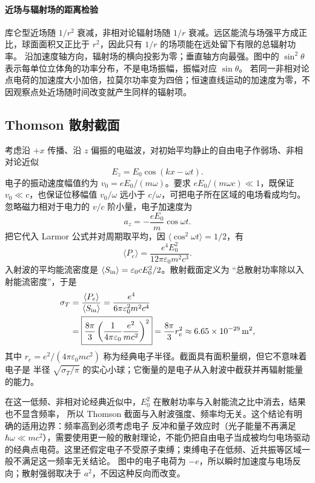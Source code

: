 \paragraph{近场与辐射场的距离检验}
库仑型近场随 $1/r^2$ 衰减，非相对论辐射场随 $1/r$ 衰减。远区能流与场强平方成正比，球面面积又正比于 $r^2$，因此只有 $1/r$ 的场项能在远处留下有限的总辐射功率。
沿加速度轴方向，辐射场的横向投影为零；垂直轴方向最强。图中的 $\sin^2\theta$ 表示每单位立体角的功率分布，不是电场振幅，振幅对应 $\sin\theta$。
若同一非相对论点电荷的加速度大小加倍，拉莫尔功率变为四倍；恒速直线运动的加速度为零，不因观察点处近场随时间改变就产生同样的辐射项。

\subsection{Thomson 散射截面}

考虑沿 $+x$ 传播、沿 $z$ 偏振的电磁波，对初始平均静止的自由电子作弱场、非相对论近似
\begin{equation}
  E_z=E_0\cos(kx-\omega t).
\end{equation}
电子的振动速度幅值约为 $v_0=eE_0/(m\omega)$。要求 $eE_0/(m\omega c)\ll1$，既保证 $v_0\ll c$，也保证位移幅值 $v_0/\omega$ 远小于 $c/\omega$，可把电子所在区域的电场看成均匀。忽略磁力相对于电力的
$v/c$ 阶小量，电子加速度为
\begin{equation}
  a_z=-\frac{eE_0}{m}\cos\omega t.
\end{equation}
把它代入 Larmor 公式并对周期取平均，因 $\langle\cos^2\omega t\rangle=1/2$，有
\begin{equation}
  \langle P_e\rangle=\frac{e^4E_0^2}{12\pi\varepsilon_0m^2c^3}.
\end{equation}
入射波的平均能流密度是 $\langle S_{\rm in}\rangle=\varepsilon_0cE_0^2/2$。散射截面定义为
“总散射功率除以入射能流密度”，于是
\begin{align}
  \sigma_T
  &=\frac{\langle P_e\rangle}{\langle S_{\rm in}\rangle}
  =\frac{e^4}{6\pi\varepsilon_0^2m^2c^4}
  \\
  &=\boxed{\frac{8\pi}{3}\left(\frac{1}{4\pi\varepsilon_0}
  \frac{e^2}{mc^2}\right)^2}
  =\frac{8\pi}{3}r_e^2
  \approx\SI{6.65e-29}{m^2},
\end{align}
其中 $r_e=e^2/(4\pi\varepsilon_0mc^2)$ 称为经典电子半径。截面具有面积量纲，但它不意味着电子是
半径 $\sqrt{\sigma_T/\pi}$ 的实心小球；它衡量的是电子从入射波中截获并再辐射能量的能力。

在这一低频、非相对论经典近似中，$E_0^2$ 在散射功率与入射能流之比中消去，结果也不显含频率，
所以 Thomson 截面与入射波强度、频率均无关。这个结论有明确的适用边界：频率高到必须考虑电子
反冲和量子效应时（光子能量不再满足 $\hbar\omega\ll mc^2$），需要使用更一般的散射理论，不能仍把自由电子当成被均匀电场驱动的经典点电荷。这里还假定电子不受原子束缚；束缚电子在低频、近共振等区域一般不满足这一频率无关结论。
图中的电子电荷为 $-e$，所以瞬时加速度与电场反向；散射强弱取决于 $a^2$，不因这种反向而改变。

